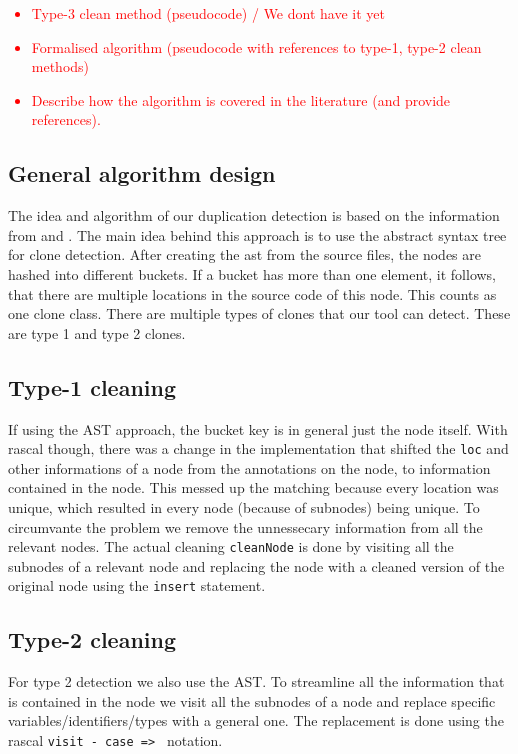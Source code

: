 \documentclass{uva-inf-article}
\newcommand\todo[1]{\textcolor{red}{#1}}
\begin{document}
\todo {
	\begin{itemize}
		\item{Type-3 clean method (pseudocode) / We dont have it yet }
		\item{Formalised algorithm (pseudocode with references to type-1, type-2 clean methods)}
		\item{Describe how the algorithm is covered in the literature (and provide references).}
	\end{itemize}
}

\subsection{General algorithm design}

The idea and algorithm of our duplication detection is based on the
information from \cite{lazar2014clone} and \cite{baxter1998clone}. 
The main idea behind this approach is to use the abstract syntax tree for clone detection.
After creating the ast from the source files,  the nodes are hashed into different buckets.
If a bucket has more than one element, it follows, that there are multiple locations in the source code of this node.
This counts as one clone class. There are multiple types of clones that our tool can detect.
These are type 1 and type 2 clones.

\subsection{Type-1 cleaning}

If using the AST approach, the bucket key is in general just the node itself. With rascal though, there was a change in the implementation
that shifted the \texttt{loc} and other informations of a node from the annotations on the node, to information contained in the node.
This messed up the matching because every location was unique, which resulted in every node (because of subnodes) being unique. 
To circumvante the problem we remove the unnessecary information from all the relevant nodes. The actual cleaning \texttt{cleanNode} is done
by visiting all the subnodes of a relevant node and replacing the node with a cleaned version of the original node using the \texttt{insert} statement.

\subsection{Type-2 cleaning}

For type 2 detection we also use the AST. To streamline all the information that is contained in the node we visit all the subnodes of a node
and replace specific variables/identifiers/types with a general one. The replacement is done using the rascal \texttt{visit - case => } notation.
\end{document}
